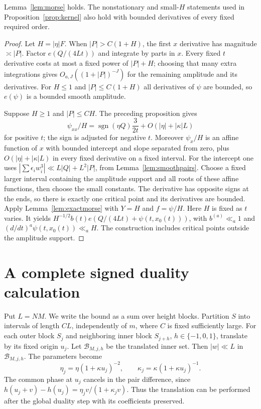 \begin{proposition}\label{prop:tuplemorseproof}
Lemma~\ref{lem:morse} holds. The nonstationary and small-$H$ statements
used in Proposition~\ref{prop:kernel} also hold with bounded derivatives
of every fixed required order.
\end{proposition}
\begin{proof}
Let $H=|\eta|F$. When $|P|>C(1+H)$, the first $x$ derivative has
magnitude $\asymp|P|$. Factor $e(Q/(4Lt))$ and integrate by parts in
$x$. Every fixed $t$ derivative costs at most a fixed power of
$|P|+H$; choosing that many extra integrations gives
$O_{a,J}((1+|P|)^{-J})$ for the remaining amplitude and its derivatives.
For $H\le1$ and $|P|\le C(1+H)$ all derivatives of $\psi$ are bounded,
so $e(\psi)$ is a bounded smooth amplitude.

Suppose $H\ge1$ and $|P|\le CH$. The preceding proposition gives
\[
 \psi_{xx}/H=\operatorname{sgn}(\eta Q)\frac3{2t}
             +O(|\eta|+|\kappa|L)
\]
for positive $t$; the sign is adjusted for negative $t$.
Moreover $\psi_x/H$ is an affine function of $x$ with bounded intercept
and slope separated from zero, plus $O(|\eta|+|\kappa|L)$ in every
fixed derivative on a fixed interval. For the intercept one uses
$|\sum\epsilon_iw_i^3|\ll L|Q|+L^2|P|$, from
Lemma~\ref{lem:smoothpairs}. Choose a fixed larger interval containing
the amplitude support and all roots of these affine functions, then
choose the small constants. The derivative has opposite signs at the
ends, so there is exactly one critical point and its derivatives are
bounded. Apply Lemma~\ref{lem:exactmorse} with $Y=H$ and $f=\psi/H$.
Here $H$ is fixed as $t$ varies. It yields
$H^{-1/2}b(t)e(Q/(4Lt)+\psi(t,x_0(t)))$, with
$b^{(a)}\ll_a1$ and $(d/dt)^a\psi(t,x_0(t))\ll_aH$.
The construction includes critical points outside the amplitude support.
\end{proof}

\section{A complete signed duality calculation}\label{app:dualityproof}

Put $L=NM$. We write the bound as a sum over height blocks. Partition $S$ into
intervals of length $CL$, independently of $m$, where $C$ is fixed
sufficiently large. For each outer block $S_j$ and neighboring inner
block $S_{j+h}$, $h\in\{-1,0,1\}$, translate by its fixed origin $u_j$.
Let $\mathcal B_{M,j,h}$ be the translated inner set. Then
$|w|\ll L$ in $\mathcal B_{M,j,h}$. The parameters become
\[
 \eta_j=\eta(1+\kappa u_j)^{-2},\qquad
 \kappa_j=\kappa(1+\kappa u_j)^{-1}.
\]
The common phase at $u_j$ cancels in the pair difference, since
$h(u_j+v)-h(u_j)=\eta_jv/(1+\kappa_jv)$. Thus the translation can be
performed after the global duality step with its coefficients preserved.


